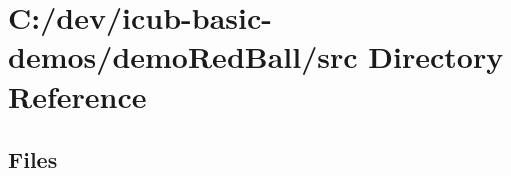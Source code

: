 \section{C\+:/dev/icub-\/basic-\/demos/demo\+Red\+Ball/src Directory Reference}
\label{dir_17fdcf4fd6dbc5dc3a4c390b4cb323f2}
\subsection*{Files}
\begin{DoxyCompactItemize}
\end{DoxyCompactItemize}
